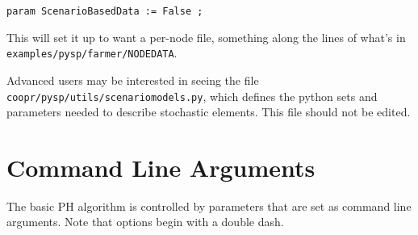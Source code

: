 \verb|param ScenarioBasedData := False ;|

This will set it up to want a per-node file, something along the lines of what's in \verb|examples/pysp/farmer/NODEDATA|.

Advanced users may be interested in seeing the file \verb|coopr/pysp/utils/scenariomodels.py|, which defines the python sets and parameters needed to describe stochastic elements. This file should not be edited. 

\section{Command Line Arguments \label{cmdargsec}}

The basic PH algorithm is controlled by parameters that are set as command line arguments. Note that options begin with a double dash.
